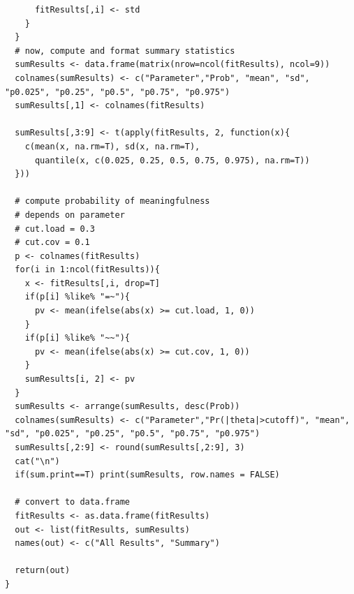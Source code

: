 \documentclass[man, noextraspace, floatsintext, 12pt]{apa7}
\begin{document}
\begin{lstlisting}
      fitResults[,i] <- std
    }
  }
  # now, compute and format summary statistics
  sumResults <- data.frame(matrix(nrow=ncol(fitResults), ncol=9))
  colnames(sumResults) <- c("Parameter","Prob", "mean", "sd", "p0.025", "p0.25", "p0.5", "p0.75", "p0.975")
  sumResults[,1] <- colnames(fitResults)
  
  sumResults[,3:9] <- t(apply(fitResults, 2, function(x){
    c(mean(x, na.rm=T), sd(x, na.rm=T),
      quantile(x, c(0.025, 0.25, 0.5, 0.75, 0.975), na.rm=T))
  }))
  
  # compute probability of meaningfulness
  # depends on parameter
  # cut.load = 0.3
  # cut.cov = 0.1
  p <- colnames(fitResults)
  for(i in 1:ncol(fitResults)){
    x <- fitResults[,i, drop=T]
    if(p[i] %like% "=~"){
      pv <- mean(ifelse(abs(x) >= cut.load, 1, 0))
    }
    if(p[i] %like% "~~"){
      pv <- mean(ifelse(abs(x) >= cut.cov, 1, 0))
    }
    sumResults[i, 2] <- pv
  }
  sumResults <- arrange(sumResults, desc(Prob))
  colnames(sumResults) <- c("Parameter","Pr(|theta|>cutoff)", "mean", "sd", "p0.025", "p0.25", "p0.5", "p0.75", "p0.975")
  sumResults[,2:9] <- round(sumResults[,2:9], 3)
  cat("\n")
  if(sum.print==T) print(sumResults, row.names = FALSE)
  
  # convert to data.frame
  fitResults <- as.data.frame(fitResults)
  out <- list(fitResults, sumResults)
  names(out) <- c("All Results", "Summary")
  
  return(out)
}
\end{lstlisting}
\end{document}
